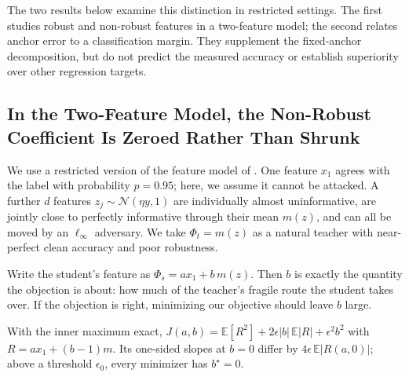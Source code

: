 The two results below examine this distinction in restricted settings. The first studies robust
and non-robust features in a two-feature model; the second relates anchor error to a classification
margin. They supplement the fixed-anchor decomposition, but do not predict the measured accuracy
or establish superiority over other regression targets.

\subsection{In the Two-Feature Model, the Non-Robust Coefficient Is Zeroed Rather Than Shrunk}

We use a restricted version of the feature model of \citet{tsipras2018robustness}.
One feature $x_1$ agrees with the label with probability $p = 0.95$; here, we assume it cannot be
attacked. A further $d$ features $z_j \sim \mathcal{N}(\eta y, 1)$ are individually almost
uninformative, are jointly close to perfectly informative through their mean $m(z)$, and can all be
moved by an $\ell_\infty$ adversary. We take $\Phi_t = m(z)$ as a natural teacher with near-perfect
clean accuracy and poor robustness.

Write the student's feature as $\Phi_s = a x_1 + b\, m(z)$. Then $b$ is exactly the quantity the
objection is about: how much of the teacher's fragile route the student takes over. If the objection
is right, minimizing our objective should leave $b$ large.

\begin{proposition}
\label{prop:l1}
With the inner maximum exact,
$J(a,b) = \mathbb{E}[R^2] + 2\epsilon\lvert b\rvert\,\mathbb{E}\lvert R\rvert + \epsilon^2 b^2$ with
$R = a x_1 + (b-1)m$. Its one-sided slopes at $b=0$ differ by
$4\epsilon\,\mathbb{E}\lvert R(a,0)\rvert$; above a threshold $\epsilon_0$, every minimizer has
$b^\star = 0$.
\end{proposition}


